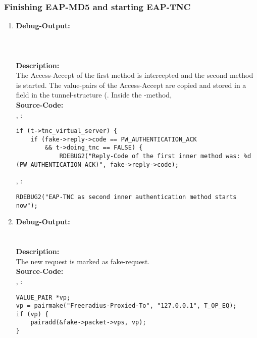 \newpage


\subsubsection*{Finishing EAP-MD5 and starting EAP-TNC}
\label{section:finishing_eap_md5_and_starting_eap_tnc}
\begin{enumerate}
\item \textbf{Debug-Output:}\\
\\
\\
\\
\newline
\textbf{Description:}\\
The Access-Accept of the first method is intercepted and the second method is started. The value-pairs of the Access-Accept are copied and stored in a field in the tunnel-structure (. Inside the -method, \\
\newline
\textbf{Source-Code:}\\
, :
\begin{lstlisting}
if (t->tnc_virtual_server) {
	if (fake->reply->code == PW_AUTHENTICATION_ACK
		&& t->doing_tnc == FALSE) {
			RDEBUG2("Reply-Code of the first inner method was: %d (PW_AUTHENTICATION_ACK)", fake->reply->code);
\end{lstlisting}
, :
\begin{lstlisting}
RDEBUG2("EAP-TNC as second inner authentication method starts now");
\end{lstlisting}

\item \textbf{Debug-Output:}\\
\\
\\
\newline
\textbf{Description:}\\
The new request is marked as fake-request.\\
\newline
\textbf{Source-Code:}\\
, :
\begin{lstlisting}
VALUE_PAIR *vp;
vp = pairmake("Freeradius-Proxied-To", "127.0.0.1", T_OP_EQ);
if (vp) {
	pairadd(&fake->packet->vps, vp);
}


\end{lstlisting}
\end{enumerate}
